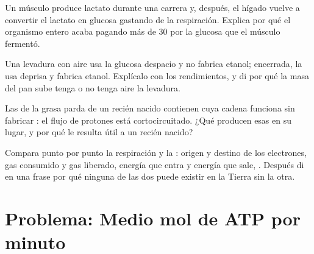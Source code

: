 \begin{exercise}[$\star\star\star$]\label{exo:g12:respiration-fermentation:12}
Un músculo produce lactato durante una carrera y, después, el hígado
vuelve a convertir el lactato en glucosa gastando  de la
respiración. Explica por qué el organismo entero acaba pagando más de
30  por la glucosa que el músculo fermentó.
\end{exercise}

\begin{exercise}[$\star\star\star$]\label{exo:g12:respiration-fermentation:13}
Una levadura con aire usa la glucosa despacio y no fabrica etanol;
encerrada, la usa deprisa y fabrica etanol. Explícalo con los
rendimientos, y di por qué la masa del pan sube tenga o no tenga aire
la levadura.
\end{exercise}

\begin{exercise}[$\star\star\star$]\label{exo:g12:respiration-fermentation:14}
Las  de la grasa parda de un recién nacido contienen
 cuya cadena funciona sin fabricar : el flujo de
protones está cortocircuitado. ¿Qué producen esas  en su lugar,
y por qué le resulta útil a un recién nacido?
\end{exercise}

\begin{exercise}[$\star\star\star$]\label{exo:g12:respiration-fermentation:15}
Compara punto por punto la respiración y la : origen y
destino de los electrones, gas consumido y gas liberado, energía que
entra y energía que sale, . Después di en una frase por qué
ninguna de las dos puede existir en la Tierra sin la otra.
\end{exercise}

\section{Problema: Medio mol de ATP por minuto}

